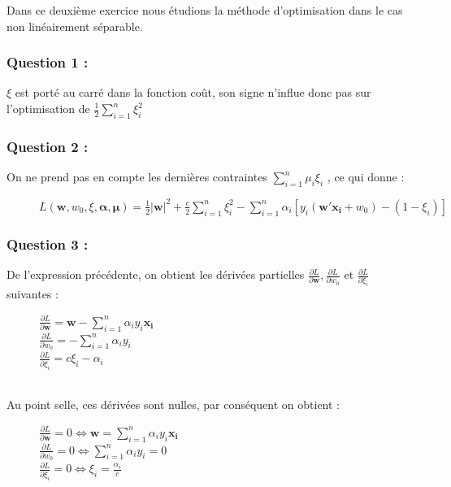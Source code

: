 \documentclass[a4paper, 10pt]{article}
\begin{document}
Dans ce deuxième exercice nous étudions la méthode d'optimisation dans le cas non linéairement séparable.

\subsubsection*{Question 1 :}

$\xi$ est porté au carré dans la fonction coût, son signe n’influe donc pas sur l’optimisation de $\frac{1}{2}\sum^{n}_{i=1} \xi^{2}_{i}$

\subsubsection*{Question 2 :}

On ne prend pas en compte les dernières contraintes $\sum^{n}_{i=1}\mu_{i}\xi_{i}$ , ce qui donne :
\begin{figure}[h!]
 \centering
$L(\mathbf{w},w_{0},\xi,\boldsymbol{\alpha},\boldsymbol{\mu}) = \frac{1}{2}| \mathbf{w} |^{2}+\frac{c}{2}\sum^{n}_{i=1} \xi^{2}_{i}-\sum^{n}_{i=1}\alpha_{i}[y_{i}(\mathbf{w'x_{i}}+w_{0})-(1-\xi_{i})]$
\end{figure}

\subsubsection*{Question 3 :}

De l'expression précédente, on obtient les dérivées partielles $ \frac{\partial L}{\partial \mathbf{w}} , \frac{\partial L}{\partial w_{0}}$ et $\frac{\partial L}{\partial \xi_{i}}$ suivantes :
\begin{figure}[h!]
 \centering
$ \frac{\partial L}{\partial \mathbf{w}} =  \mathbf{w} - \sum^{n}_{i=1}\alpha_{i}y_{i}\mathbf{x_{i}}  $\\
$\frac{\partial L}{\partial w_{0}} =  -\sum^{n}_{i=1}\alpha_{i}y_{i}  $\\
$ \frac{\partial L}{\partial \xi_{i}}  =   c\xi_{i} - \alpha_{i}$
\end{figure}\\
Au point selle, ces dérivées sont nulles, par conséquent on obtient :
\begin{figure}[h!]
 \centering
$ \frac{\partial L}{\partial \mathbf{w}} = 0 \Longleftrightarrow \mathbf{w} = \sum^{n}_{i=1}\alpha_{i}y_{i}\mathbf{x_{i}}  $\\
$\frac{\partial L}{\partial w_{0}} = 0 \Longleftrightarrow  \sum^{n}_{i=1}\alpha_{i}y_{i} = 0  $\\
$ \frac{\partial L}{\partial \xi_{i}}  = 0  \Longleftrightarrow  \xi_{i} = \frac{\alpha_{i}}{c} $
\end{figure}
\end{document}
